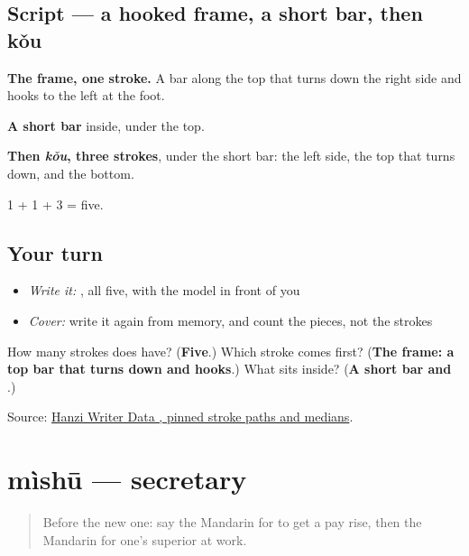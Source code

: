 \subsection*{Script — a hooked frame, a short bar, then kǒu}

\begin{quote}
\end{quote}

\textbf{The frame, one stroke.} A bar along the top that turns down the right side and hooks to the left at the foot.

\textbf{A short bar} inside, under the top.

\textbf{Then  \emph{kǒu}, three strokes}, under the short bar: the left side, the top that turns down, and the bottom.

1 + 1 + 3 = five.

\subsection*{Your turn}
\begin{itemize}
\raggedright
  \item \emph{Write it:} , all five, with the model in front of you
  \item \emph{Cover:} write it again from memory, and count the pieces, not the strokes
\end{itemize}

\begin{tcolorbox}[breakable,colback=teal!4,colframe=teal!35!black,title={Before you move on}]
How many strokes does  have? (\textbf{Five}.) Which stroke comes first? (\textbf{The frame: a top bar that turns down and hooks}.) What sits inside? (\textbf{A short bar and }.)

Source: \href{https://raw.githubusercontent.com/chanind/hanzi-writer-data/68d10a4b21150cae5e1ebbd223eed289cf32d90c/data/\%E5\%8F\%B8.json}{Hanzi Writer Data , pinned stroke paths and medians}.
\end{tcolorbox}
\section[mìshū]{mìshū — secretary}

\label{lesson:ZH-C491-mishu}



\begin{quote}
Before the new one: say the Mandarin for to get a pay rise, then the Mandarin for one's superior at work.
\end{quote}

